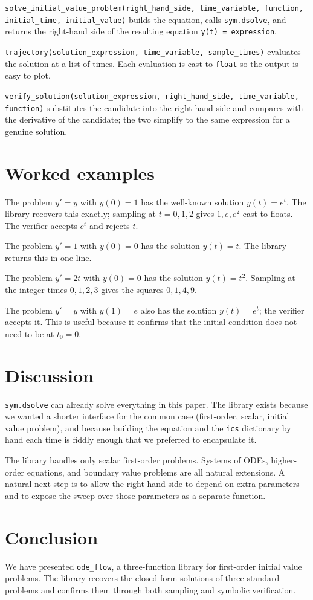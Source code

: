 \documentclass[11pt]{article}
\begin{document}
\texttt{solve\_initial\_value\_problem(right\_hand\_side,
time\_variable, function, initial\_time, initial\_value)} builds the
equation, calls \texttt{sym.dsolve}, and returns the right-hand side
of the resulting equation \texttt{y(t) = expression}.

\texttt{trajectory(solution\_expression, time\_variable,
sample\_times)} evaluates the solution at a list of times. Each
evaluation is cast to \texttt{float} so the output is easy to plot.

\texttt{verify\_solution(solution\_expression, right\_hand\_side,
time\_variable, function)} substitutes the candidate into the
right-hand side and compares with the derivative of the candidate;
the two simplify to the same expression for a genuine solution.

\section{Worked examples}

The problem \(y' = y\) with
\(y(0) = 1\) has the well-known solution \(y(t) = e^t\). The library
recovers this exactly; sampling at \(t = 0, 1, 2\) gives
\(1, e, e^2\) cast to floats. The verifier accepts \(e^t\) and
rejects \(t\).

The problem \(y' = 1\) with \(y(0) = 0\)
has the solution \(y(t) = t\). The library returns this in one line.

The problem \(y' = 2t\) with \(y(0) = 0\)
has the solution \(y(t) = t^2\). Sampling at the integer times
\(0, 1, 2, 3\) gives the squares \(0, 1, 4, 9\).

The problem \(y' = y\) with
\(y(1) = e\) also has the solution \(y(t) = e^t\); the verifier
accepts it. This is useful because it confirms that the initial
condition does not need to be at \(t_0 = 0\).

\section{Discussion}

\texttt{sym.dsolve} can already solve
everything in this paper. The library exists because we wanted a
shorter interface for the common case (first-order, scalar, initial
value problem), and because building the equation and the
\texttt{ics} dictionary by hand each time is fiddly enough that we
preferred to encapsulate it.

The library handles only scalar first-order
problems. Systems of ODEs, higher-order equations, and boundary value
problems are all natural extensions. A natural next step is to allow
the right-hand side to depend on extra parameters and to expose the
sweep over those parameters as a separate function.

\section{Conclusion}

We have presented \texttt{ode\_flow}, a three-function library for
first-order initial value problems. The library recovers the
closed-form solutions of three standard problems and confirms them
through both sampling and symbolic verification.



\end{document}
